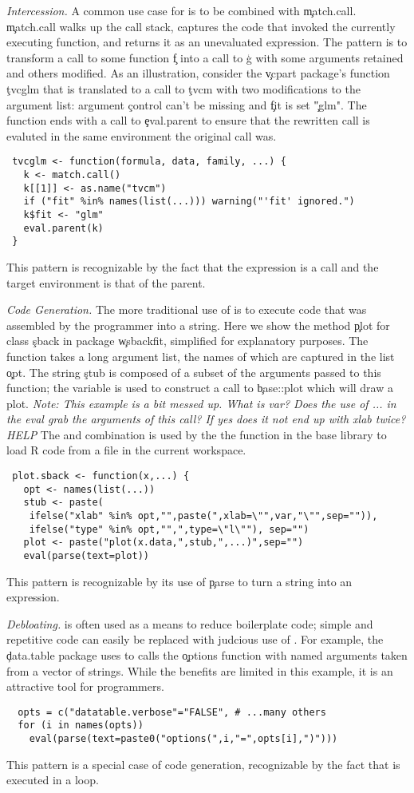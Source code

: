 \documentclass[screen,acmsmall]{acmart}
\newcommand{\mypara}[1]{\medskip\noindent\emph{#1}\xspace}
\newcommand{\NOTE}[1]{{\it Note: #1}\xspace}
\begin{document}
\mypara{Intercession.} A common use case for \eval is to be combined with
\c{match.call}. \c{match.call} walks up the call stack, captures the code that
invoked the currently executing function, and returns it as an unevaluated
expression. The pattern is to transform a call to some function \c{f} into a
call to \c{g} with some arguments retained and others modified. As an
illustration, consider the \c{vcpart} package's function \c{tvcglm} that is
translated to a call to \c{tvcm} with two modifications to the argument list:
argument \c{control} can't be missing and \c{fit} is set \c{"glm"}. The function
ends with a call to \c{eval.parent} to ensure that the rewritten call is
evaluted in the same environment the original call was.
\begin{lstlisting}
 tvcglm <- function(formula, data, family, ...) {
   k <- match.call()
   k[[1]] <- as.name("tvcm")
   if ("fit" %in% names(list(...))) warning("'fit' ignored.")
   k$fit <- "glm"
   eval.parent(k)
 }
\end{lstlisting}
This pattern is recognizable by the fact that the expression is a call
and the target environment is that of the parent.

\mypara{Code Generation.} The more traditional use of \eval is to execute code
that was assembled by the programmer into a string. Here we show the method
\c{plot} for class \c{sback} in package \c{wsbackfit}, simplified for
explanatory purposes. The function takes a long argument list, the names of
which are captured in the list \c{opt}. The string \c{stub} is composed of a
subset of the arguments passed to this function; the variable is used to
construct a call to \c{base::plot} which will draw a plot. \NOTE{This example is
  a bit messed up. What is var? Does the use of ... in the eval grab the
  arguments of this call? If yes does it not end up with xlab twice? HELP} The
\parse and \eval combination is used by the the \source function in the base
library to load R code from a file in the current workspace.
\begin{lstlisting}
 plot.sback <- function(x,...) {
   opt <- names(list(...))
   stub <- paste(
    ifelse("xlab" %in% opt,"",paste(",xlab=\"",var,"\"",sep="")),
    ifelse("type" %in% opt,"",",type=\"l\""), sep="")
   plot <- paste("plot(x.data,",stub,",...)",sep="")
   eval(parse(text=plot))
\end{lstlisting}
This pattern is recognizable by its use of \c{parse} to turn a string
into an expression.


\mypara{Debloating.} \Eval is often used as a means to reduce boilerplate code;
simple and repetitive code can easily be replaced with judcious use of \eval.
For example, the \c{data.table} package uses \eval to calls the \c{options}
function with named arguments taken from a vector of strings. While the benefits
are limited in this example, it is an attractive tool for programmers.
\begin{lstlisting}
  opts = c("datatable.verbose"="FALSE", # ...many others
  for (i in names(opts))
    eval(parse(text=paste0("options(",i,"=",opts[i],")")))
\end{lstlisting}
This pattern is a special case of code generation, recognizable by the
fact that \eval is executed in a loop.
\end{document}

